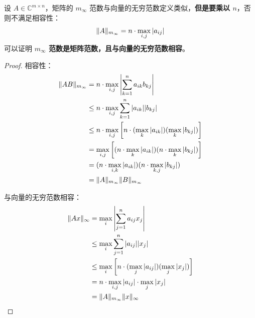\begin{definition}[$m_\infty$ 范数]
设 $A\in\mathbb C^{m\times n}$，矩阵的 $m_\infty$ 范数与向量的无穷范数定义类似，\textbf{但是要乘以 $n$}，否则不满足相容性：
\[
    \Vert A\Vert_{m_\infty}=n\cdot\max_{i,j}|a_{ij}|
\]
可以证明 \textbf{$m_\infty$ 范数是矩阵范数，且与向量的无穷范数相容}。
\end{definition}
\begin{proof}
相容性：
\begin{align*}
\Vert AB\Vert_{m_\infty}&=n\cdot\max_{i,j}\left|\sum_{k=1}^n a_{ik}b_{kj}\right|\\
&\leq n\cdot\max_{i,j}\sum_{k=1}^n |a_{ik}||b_{kj}|\\
&\leq n\cdot\max_{i,j}\left[n\cdot(\max_k |a_{ik}|)(\max_k |b_{kj}|)\right]\\
&=\max_{i,j}\left[(n\cdot \max_k |a_{ik}|)(n\cdot\max_k |b_{kj}|)\right]\\
&=(n\cdot \max_{i,k} |a_{ik}|)(n\cdot\max_{k,j} |b_{kj}|)\\
&=\Vert A\Vert_{m_\infty}\Vert B\Vert_{m_\infty}
\end{align*}

与向量的无穷范数相容：
\begin{align*}
\Vert Ax\Vert_{\infty}&=\max_i\left|\sum_{j=1}^na_{ij}x_j\right|\\
&\leq\max_i\sum_{j=1}^n|a_{ij}||x_j|\\
&\leq\max_i\left[n\cdot(\max_j |a_{ij}|)(\max_j |x_j|)\right]\\
&=n\cdot\max_{i,j}|a_{ij}|\cdot\max_j |x_j|\\
&=\Vert A\Vert_{m_\infty}\Vert x\Vert_{\infty}
\end{align*}
\end{proof}

